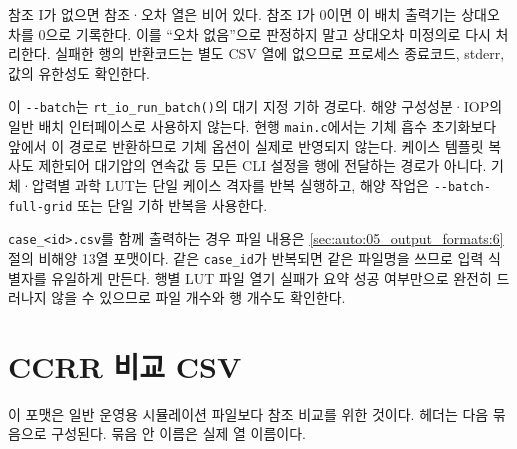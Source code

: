 참조 I가 없으면 참조·오차 열은 비어 있다. 참조 I가 0이면 이 배치 출력기는 상대오차를 0으로 기록한다. 이를 “오차 없음”으로 판정하지 말고 상대오차 미정의로 다시 처리한다. 실패한 행의 반환코드는 별도 CSV 열에 없으므로 프로세스 종료코드, stderr, 값의 유한성도 확인한다.

이 \texttt{-\allowbreak{}-\allowbreak{}batch}는 \texttt{rt\_\allowbreak{}io\_\allowbreak{}run\_\allowbreak{}batch()}의 대기 지정 기하 경로다. 해양 구성성분·IOP의 일반 배치 인터페이스로 사용하지 않는다. 현행 \texttt{main.\allowbreak{}c}에서는 기체 흡수 초기화보다 앞에서 이 경로로 반환하므로 기체 옵션이 실제로 반영되지 않는다. 케이스 템플릿 복사도 제한되어 대기압의 연속값 등 모든 CLI 설정을 행에 전달하는 경로가 아니다. 기체·압력별 과학 LUT는 단일 케이스 격자를 반복 실행하고, 해양 작업은 \texttt{-\allowbreak{}-\allowbreak{}batch-\allowbreak{}full-\allowbreak{}grid} 또는 단일 기하 반복을 사용한다.

\texttt{case\_\allowbreak{}<id>.\allowbreak{}csv}를 함께 출력하는 경우 파일 내용은 \ref{sec:auto:05_output_formats:6}절의 비해양 13열 포맷이다. 같은 \texttt{case\_\allowbreak{}id}가 반복되면 같은 파일명을 쓰므로 입력 식별자를 유일하게 만든다. 행별 LUT 파일 열기 실패가 요약 성공 여부만으로 완전히 드러나지 않을 수 있으므로 파일 개수와 행 개수도 확인한다.

\section{CCRR 비교 CSV}
\label{sec:auto:05_output_formats:9}
이 포맷은 일반 운영용 시뮬레이션 파일보다 참조 비교를 위한 것이다. 헤더는 다음 묶음으로 구성된다. 묶음 안 이름은 실제 열 이름이다.


